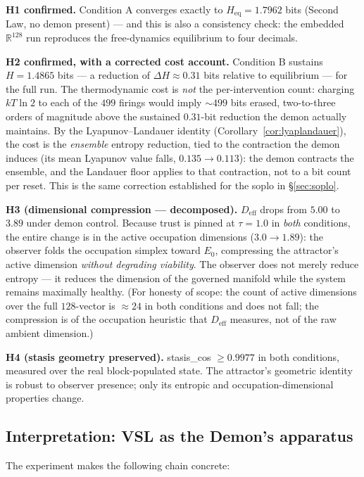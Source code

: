 \documentclass[11pt, a4paper]{article}
\begin{document}
\textbf{H1 confirmed.}  Condition A converges exactly to $H_\text{eq} = 1.7962$
bits (Second Law, no demon present) --- and this is also a consistency check:
the embedded $\mathbb{R}^{128}$ run reproduces the free-dynamics equilibrium to
four decimals.

\textbf{H2 confirmed, with a corrected cost account.}  Condition B sustains
$H = 1.4865$ bits --- a reduction of $\Delta H \approx 0.31$ bits relative to
equilibrium --- for the full run.  The thermodynamic cost is \emph{not} the
per-intervention count: charging $kT\ln 2$ to each of the $499$ firings would
imply $\sim 499$ bits erased, two-to-three orders of magnitude above the
sustained $0.31$-bit reduction the demon actually maintains.  By the
Lyapunov--Landauer identity (Corollary~\ref{cor:lyaplandauer}), the cost is the
\emph{ensemble} entropy reduction, tied to the contraction the demon induces
(its mean Lyapunov value falls, $0.135 \to 0.113$): the demon contracts the
ensemble, and the Landauer floor applies to that contraction, not to a bit count
per reset.  This is the same correction established for the soplo in
\S\ref{sec:soplo}.

\textbf{H3 (dimensional compression --- decomposed).}  $D_\text{eff}$ drops from
$5.00$ to $3.89$ under demon control.  Because trust is pinned at $\tau = 1.0$ in
\emph{both} conditions, the entire change is in the active occupation dimensions
($3.0 \to 1.89$): the observer folds the occupation simplex toward $E_0$,
compressing the attractor's active dimension \emph{without degrading viability}.
The observer does not merely reduce entropy --- it reduces the dimension of the
governed manifold while the system remains maximally healthy.  (For honesty of
scope: the count of active dimensions over the full $128$-vector is $\approx 24$
in both conditions and does not fall; the compression is of the occupation
heuristic that $D_\text{eff}$ measures, not of the raw ambient dimension.)

\textbf{H4 (stasis geometry preserved).}  stasis\_cos $\geq 0.9977$ in both
conditions, measured over the real block-populated state.  The attractor's
geometric identity is robust to observer presence; only its entropic and
occupation-dimensional properties change.

\subsection{Interpretation: VSL as the Demon's apparatus}

The experiment makes the following chain concrete:
\end{document}
